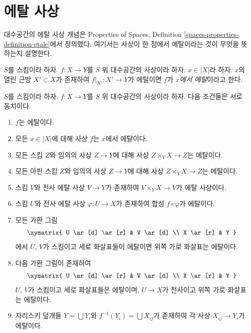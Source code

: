 \section{에탈 사상}
\label{section-etale}

\noindent
대수공간의 에탈 사상 개념은 Properties of Spaces, Definition
\ref{spaces-properties-definition-etale}에서 정의했다. 여기서는 사상이
한 점에서 에탈이라는 것이 무엇을 뜻하는지 설명한다.

\begin{definition}
\label{definition-etale}
$S$를 스킴이라 하자.
$f : X \to Y$를 $S$ 위 대수공간의 사상이라 하자.
$x \in |X|$라 하자. $x$의 열린 근방 $X' \subset X$가 존재하여
$f|_{X'} : X' \to Y$가 에탈이면 $f$가 {\it $x$에서 에탈}이라고 한다.
\end{definition}

\begin{lemma}
\label{lemma-etale-local}
$S$를 스킴이라 하자.
$f : X \to Y$를 $S$ 위 대수공간의 사상이라 하자.
다음 조건들은 서로 동치이다.
\begin{enumerate}
\item $f$는 에탈이다.
\item 모든 $x \in |X|$에 대해 사상 $f$는 $x$에서 에탈이다.
\item 모든 스킴 $Z$와 임의의 사상 $Z \to Y$에 대해 사상
$Z \times_Y X \to Z$는 에탈이다.
\item 모든 아핀 스킴 $Z$와 임의의 사상
$Z \to Y$에 대해 사상 $Z \times_Y X \to Z$는 에탈이다.
\item 스킴 $V$와 전사 에탈 사상 $V \to Y$가 존재하여
$V \times_Y X \to V$가 에탈 사상이다.
\item 스킴 $U$와 전사 에탈 사상 $\varphi : U \to X$가 존재하여
합성 $f \circ \varphi$가 에탈이다.
\item 모든 가환 그림
$$
\xymatrix{
U \ar[d] \ar[r] & V \ar[d] \\
X \ar[r] & Y
}
$$
에서 $U$, $V$가 스킴이고 세로 화살표들이 에탈이면 위쪽 가로
화살표는 에탈이다.
\item 다음 가환 그림이 존재하여
$$
\xymatrix{
U \ar[d] \ar[r] & V \ar[d] \\
X \ar[r] & Y
}
$$
$U$, $V$가 스킴이고 세로 화살표들은 에탈이며, $U \to X$가
전사이고 위쪽 가로 화살표는 에탈이다.
\item 자리스키 덮개들 $Y = \bigcup Y_i$와
$f^{-1}(Y_i) = \bigcup X_{ij}$가 존재하여 각 사상
$X_{ij} \to Y_i$가 에탈이다.
\end{enumerate}
\end{lemma}

